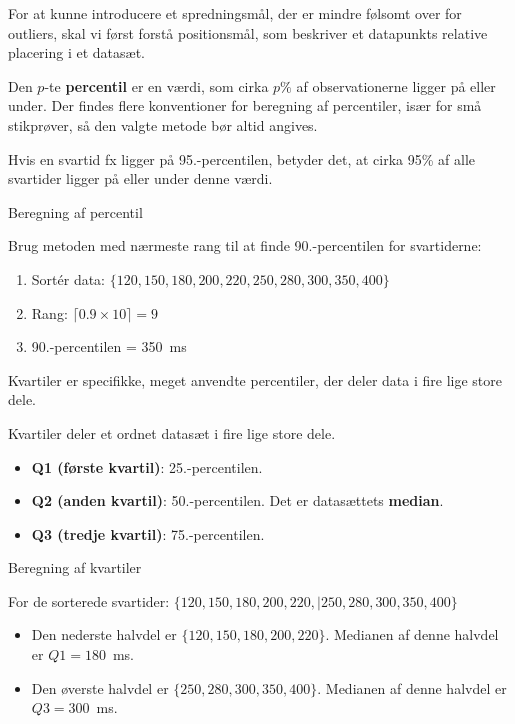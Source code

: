 For at kunne introducere et spredningsmål, der er mindre følsomt over for outliers, skal vi først forstå positionsmål, som beskriver et datapunkts relative placering i et datasæt.

\begin{definition}[Percentil]
Den $p$-te \textbf{percentil} er en værdi, som cirka $p\%$ af observationerne ligger på eller under. Der findes flere konventioner for beregning af percentiler, især for små stikprøver, så den valgte metode bør altid angives.
\end{definition}

Hvis en svartid fx ligger på 95.-percentilen, betyder det, at cirka 95\% af alle svartider ligger på eller under denne værdi.

\begin{example} Beregning af percentil

    Brug metoden med nærmeste rang til at finde 90.-percentilen for svartiderne:
\begin{enumerate}
        \item Sortér data: $\{120, 150, 180, 200, 220, 250, 280, 300, 350, 400\}$
        \item Rang: $\lceil 0.9 \times 10\rceil = 9$
        \item 90.-percentilen = 350~ms
\end{enumerate}
    \end{example}

Kvartiler er specifikke, meget anvendte percentiler, der deler data i fire lige store dele.

\begin{definition}[Kvartiler]

Kvartiler deler et ordnet datasæt i fire lige store dele.

\begin{itemize}
    \item \textbf{Q1 (første kvartil)}: 25.-percentilen.
    \item \textbf{Q2 (anden kvartil)}: 50.-percentilen. Det er datasættets \textbf{median}.
    \item \textbf{Q3 (tredje kvartil)}: 75.-percentilen.
\end{itemize}
\end{definition}

\begin{example} Beregning af kvartiler

For de sorterede svartider: $\{120, 150, 180, 200, 220, | 250, 280, 300, 350, 400\}$
\begin{itemize}
    \item Den nederste halvdel er $\{120, 150, 180, 200, 220\}$. Medianen af denne halvdel er $Q1 = 180$~ms.
    \item Den øverste halvdel er $\{250, 280, 300, 350, 400\}$. Medianen af denne halvdel er $Q3 = 300$~ms.
\end{itemize}
\end{example}

